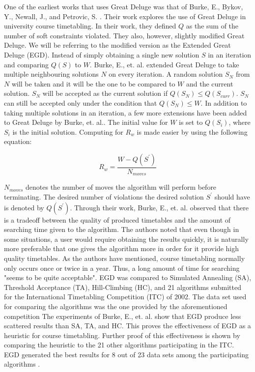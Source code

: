 One of the earliest works that uses Great Deluge was that of Burke, E., Bykov, Y., Newall, J., and Petrovic, S. \cite{gd-burke}. Their work explores the use of Great Deluge in university course timetabling. In their work, they defined $Q$ as the sum of the number of soft constraints violated. They also, however, slightly modified Great Deluge. We will be referring to the modified version as the Extended Great Deluge (EGD). Instead of simply obtaining a single new solution $S$ in an iteration and comparing $Q(S)$ to $W$. Burke, E., et. al. extended Great Deluge to take multiple neighbouring solutions $N$ on every iteration. A random solution $S_{N}$ from $N$ will be taken and it will be the one to be compared to $W$ and the current solution. $S_{N}$ will be accepted as the current solution if $Q(S_{N}) \leq Q(S_{curr})$. $S_{N}$ can still be accepted only under the condition that $Q(S_{N}) \leq W$. In addition to taking multiple solutions in an iteration, a few more extensions have been added to Great Deluge by Burke, et. al.. The initial value for $W$ is set to $Q(S_{i})$, where $S_{i}$ is the initial solution. Computing for $R_{w}$ is made easier by using the following equation:

\[
    R_{w} = \frac{W - Q(S^{'})}{N_{moves}}
\]

$N_{moves}$ denotes the number of moves the algorithm will perform before terminating. The desired number of violations the desired solution $S^{'}$ should have is denoted by $Q(S^{'})$. Through their work, Burke, E., et. al. observed that there is a tradeoff between the quality of produced timetables and the amount of searching time given to the algorithm. The authors noted that even though in some situations, a user would require obtaining the results quickly, it is naturally more preferable that one gives the algorithm more in order for it provide high quality timetables. As the authors have mentioned, course timetabling normally only occurs once or twice in a year. Thus, a long amount of time for searching "seems to be quite acceptable". EGD was compared to Simulated Annealing (SA), Threshold Acceptance (TA), Hill-Climbing (HC), and 21 algorithms submitted for the International Timetabling Competition (ITC) of 2002. The data set used for comparing the algorithms was the one provided by the aforementioned competition The experiments of Burke, E., et. al. show that EGD produce less scattered results than SA, TA, and HC. This proves the effectiveness of EGD as a heuristic for course timetabling. Further proof of this effectiveness is shown by comparing the heuristic to the 21 other algorithms participating in the ITC. EGD generated the best results for 8 out of 23 data sets among the participating algorithms \cite{gd-burke}.


